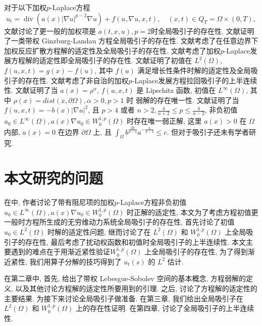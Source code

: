 \documentclass[oneside,longtitle]{LZUthesis}
\numberwithin{equation}{chapter}
\newcommand*\abs[1]{\lvert#1\rvert}
\DeclareMathOperator{\Div}{div}
\begin{document}
对于以下加权$p$-Laplace方程
\begin{equation*}
	u_t = \Div(a(x)\abs{\nabla u}^{p-2}\nabla u) + f(u, \nabla u, x, t), \quad (x, t) \in Q_T = \Omega \times (0, T),
\end{equation*}
文献\citep{constantinGlobalSolutionsQuasilinear2002}讨论了更一般的加权项是 $a(t, x, u), p = 2$时全局吸引子的存在性.
文献\citep{karachaliosConvergenceAttractorsDegenerate2005}证明了一类带权 Ginzburg-Landau 方程全局吸引子的存在性.
文献\citep{anhGlobalExistenceLongtime2008}考虑了在任意边界下加权反应扩散方程解的适定性及全局吸引子的存在性.
文献\citep{anhLongtimeBehaviorQuasilinear2009}考虑了加权$p$-Laplace发展方程解的适定性即全局吸引子的存在性.
文献\citep{maGlobalAttractorsWeighted2012a}证明了初值在 $L^2(\Omega)$, $f(u, x, t) = g(x) - f(u)$, 其中 $f(u)$ 满足增长性条件时解的适定性及全局吸引子的存在性.
文献\citep{simsenExistenceUpperSemicontinuity2014}考虑了非自治的加权$p$-Laplace发展方程拉回吸引子的上半连续性.
文献\citep{zhanParabolicEquationRelated2016}证明了当
$a(x) = \rho^\alpha$, $f(u, x, t)$ 是 Lipschitz 函数, 初值在 $L^\infty(\Omega)$, 其中 $\rho(x) = dist(x, \partial \Omega), \alpha > 0, p > 1$ 时
弱解的存在唯一性.
文献\citep{Zhan2019Uniquenessa}证明了当 $f(u, x, t) = -b(x)\abs{\nabla u}^2$,
且 $p > 4$ 或者 $n > 2, \frac{4}{n+2} \leq p \leq \frac{4}{n-2}$,
非负初值 $u_0 \in L^\infty(\Omega), a(x)\nabla u_0 \in W_0^{1, p}(\Omega)$ 时存在唯一弱正解,
这里 $a(x) > 0$ 在 $\Omega$ 内部, $a(x) = 0$ 在边界 $\partial\Omega$ 上,
且 $\int_{\Omega} b^{\frac{2p}{p-4}}a^{-\frac{4}{p-4}} \leq c$.
但对于吸引子还未有学者研究.

\section{本文研究的问题}
在\citep{Zhan2019Uniquenessa}中, 作者讨论了带有阻尼项的加权$p$-Laplace方程非负初值
$u_0 \in L^\infty(\Omega), a(x)\nabla u_0 \in W_0^{1, p}(\Omega)$ 时正解的适定性,
本文为了考虑方程初值更一般时方程所生成的无穷维动力系统全局吸引子的存在性, 首先讨论了初值 $u_0 \in L^2(\Omega)$ 时解的适定性问题,
继而讨论了在 $L^2(\Omega)$ 和 $W_0^{1, p}(\Omega)$ 上全局吸引子的存在性, 最后考虑了扰动权函数和初值时全局吸引子的上半连续性.
本文主要遇到的难点在于用渐近紧性验证$W_0^{1, p}(\Omega)$ 上全局吸引子的存在性,
为了得到渐近紧性, 我们用算子分解的技巧得到了 $u_t(s)$ 的 $L^2$ 估计.

在第二章中, 首先, 给出了带权 Lebesgue-Sobolev 空间的基本概念, 方程弱解的定义,
以及其他讨论方程解的适定性所要用到的引理.
之后, 讨论了方程解的适定性的主要结果. 为接下来讨论全局吸引子做准备.
在第三章, 我们给出全局吸引子在
$L^2(\Omega)$ 和 $W_0^{1,p}(\Omega)$ 上的存在性证明.
在第四章, 讨论了全局吸引子的上半连续性.
\end{document}
